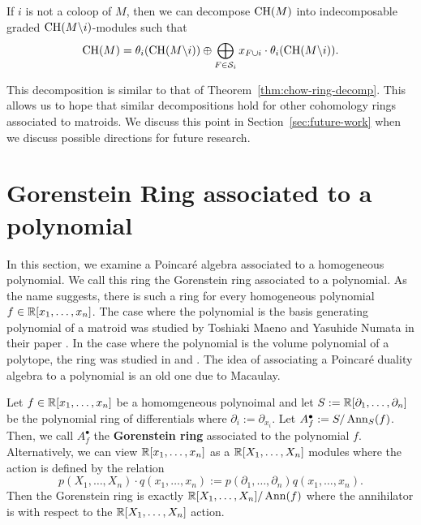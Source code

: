 \documentclass{puthesis-UG}
\begin{document}
\begin{thm} \label{thm:augmented-chow-ring-krull-schmidt-decomp}
	If $i$ is not a coloop of $M$, then we can decompose $\operatorname{CH}(M)$ into indecomposable graded $\operatorname{CH}(M \backslash i)$-modules such that 
	\[
		\operatorname{CH}(M) = \theta_i (\operatorname{CH}(M \backslash i)) \oplus \bigoplus_{F \in \mathcal{S}_i} x_{F \cup i} \cdot \theta_i (\operatorname{CH}(M \backslash i)).
	\]
\end{thm}

This decomposition is similar to that of Theorem~\ref{thm:chow-ring-decomp}. This allows us to hope that similar decompositions hold for other cohomology rings associated to matroids. We discuss this point in Section~\ref{sec:future-work} when we discuss possible directions for future research. 

\section{Gorenstein Ring associated to a polynomial}

In this section, we examine a Poincar\'e algebra associated to a homogeneous polynomial. We call this ring the Gorenstein ring associated to a polynomial. As the name suggests, there is such a ring for every homogeneous polynomial $f \in \mathbb{R} [x_1, \ldots, x_n]$. The case where the polynomial is the basis generating polynomial of a matroid was studied by Toshiaki Maeno and Yasuhide Numata in their paper \cite{MN-gorenstein}. In the case where the polynomial is the volume polynomial of a polytope, the ring was studied in \cite{riemann-roch-thm-for-virtual-polytopes} and \cite{Timorin_1999}. The idea of associating a Poincar\'e duality algebra to a polynomial is an old one due to Macaulay. 

\begin{defn}
	Let $f \in \mathbb{R}[x_1, \ldots, x_n]$ be a homomgeneous polynoimal and let $S := \mathbb{R}[\partial_1, \ldots, \partial_n]$ be the polynomial ring of differentials where $\partial_i := \partial_{x_i}$. Let $A_f^\bullet := S / \operatorname{Ann}_S (f)$. Then, we call $A_f^\bullet$ the \textbf{Gorenstein ring} associated to the polynomial $f$. Alternatively, we can view $\mathbb{R}[x_1, \ldots, x_n]$ as a $\mathbb{R}[X_1, \ldots, X_n]$ modules where the action is defined by the relation
	\[
		p(X_1, \ldots, X_n) \cdot q(x_1, \ldots, x_n) := p(\partial_1, \ldots, \partial_n) q(x_1, \ldots, x_n). 
	\]
	Then the Gorenstein ring is exactly $\mathbb{R}[X_1, \ldots, X_n] / \operatorname{Ann} (f)$ where the annihilator is with respect to the $\mathbb{R}[X_1, \ldots, X_n]$ action. 
\end{defn}
\end{document}
